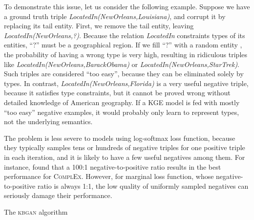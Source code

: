 \documentclass[11pt,a4paper]{article}
\begin{document}
To demonstrate this issue, let us consider the following example. Suppose we have a ground truth triple \emph{LocatedIn(NewOrleans,Louisiana)}, and corrupt it by replacing its tail entity. First, we remove the tail entity, leaving \emph{LocatedIn(NewOrleans,?)}. 
Because the relation \emph{LocatedIn} constraints types of its entities, ``?'' must be a geographical region. If we fill ``?'' with a random entity , the probability of  having a wrong type is very high, resulting in ridiculous triples like \emph{LocatedIn(NewOrleans,BarackObama)} or \emph{LocatedIn(NewOrleans,StarTrek)}. Such triples are considered ``too easy'', because they can be eliminated solely by types. In contrast, \emph{LocatedIn(NewOrleans,Florida)} is a very useful negative triple, because it satisfies type constraints, but it cannot be proved wrong without detailed knowledge of American geography. If a KGE model is fed with mostly ``too easy'' negative examples, it would probably only learn to represent types, not the underlying semantics.

The problem is less severe to models using log-softmax loss function, because they typically samples tens or hundreds of negative triples for one positive triple in each iteration, and it is likely to have a few useful negatives among them. For instance, \cite{trouillon2016complex} found that a 100:1 negative-to-positive ratio results in the best performance for \textsc{ComplEx}. However, for marginal loss function, whose negative-to-positive ratio is always 1:1, the low quality of uniformly sampled negatives can seriously damage their performance.

\begin{algorithm*}[t]
\small
 \caption{The \textsc{kbgan} algorithm}
 \label{alg:kbgan}
\end{algorithm*}
\end{document}
